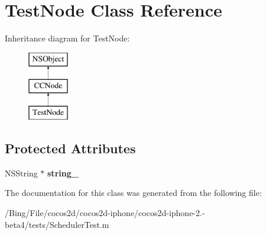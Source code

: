 \hypertarget{interface_test_node}{\section{Test\-Node Class Reference}
\label{interface_test_node}
}
Inheritance diagram for Test\-Node\-:\begin{figure}[H]
\begin{center}
\leavevmode
\includegraphics[height=3.000000cm]{interface_test_node}
\end{center}
\end{figure}
\subsection*{Protected Attributes}
\begin{DoxyCompactItemize}
\item 
\hypertarget{interface_test_node_a3137fa79c8ffc1f9b3d117c1f3743c2b}{N\-S\-String $\ast$ {\bfseries string\-\_\-}}\label{interface_test_node_a3137fa79c8ffc1f9b3d117c1f3743c2b}

\end{DoxyCompactItemize}


The documentation for this class was generated from the following file\-:\begin{DoxyCompactItemize}
\item 
/\-Bing/\-File/cocos2d/cocos2d-\/iphone/cocos2d-\/iphone-\/2.-\/beta4/tests/Scheduler\-Test.\-m\end{DoxyCompactItemize}
